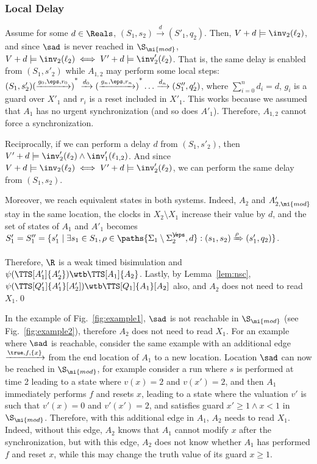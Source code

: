 \documentclass{LMCS}
\theoremstyle{plain}\newtheorem*{prop11}{Proposition~\ref{prop:states} bis}
\begin{document}
  \subsubsection*{Local Delay}
  Assume for some $d\in\Reals$, $(S_1,s_2)\xrightarrow{d}(S'_1,q_2)$.
  Then, \mbox{$V+d\models\inv_2(\ell_2)$}, and since $\sad$ is never reached
  in $\S_\mi{mod}$, $V+d\models\inv_2(\ell_2)\iff V'+d\models\inv'_2(\ell_2)$.
  That is, the same delay is enabled from $(S_1,s'_2)$ while $A_{1,2}$ may
  perform some local steps:
  $(S_1,s'_2){(\xrightarrow{g_0,\eps,r_0})}^*\xrightarrow{d_0}
  {(\xrightarrow{g_n,\eps,r_n})}^*\dots\xrightarrow{d_n}(S''_1,q'_2)$,
  where $\sum_{i=0}^nd_i=d$, $g_i$ is a guard over $X'_1$ and $r_i$ is a reset
  included in $X'_1$.
  This works because we assumed that $A_1$ has no urgent synchronization
  (and so does $A'_1$).
  Therefore, $A_{1,2}$ cannot force a synchronization.

  Reciprocally, if we can perform a delay $d$ from $(S_1,s'_2)$, then
  $V'+d\models\inv'_2(\ell_2)\land\inv'_1(\ell_{1,2})$.
And since
  $V+d\models\inv_2(\ell_2)\iff V'+d\models\inv'_2(\ell_2)$,
  we can perform the same delay from $(S_1,s_2)$.

  Moreover, we reach equivalent states in both systems. Indeed, $A_2$ and
  $A'_{2,\mi{mod}}$ stay in the same location, the clocks in $X_2\setminus X_1$
  increase their value by $d$, and the set of states of $A_1$ and $A'_1$ becomes
  $S'_1=S''_1=\{s'_1\mid \exists s_1\in S_1,\rho\in \paths{\Sigma_1\setminus\Sigma_{2}^{\not\eps},d}:
  (s_1,s_2)\xRightarrow{\rho}(s'_1,q_2)\}$.

  Therefore, $\R$ is a weak timed bisimulation and
  $\psi(\TTS[A'_1]{A'_2})\wtb\TTS[A_1]{A_2}$.
  Lastly, by Lemma~\ref{lem:nsc}, $\psi(\TTS[Q'_1]{A'_1}[A'_2])\wtb\TTS[Q_1]{A_1}[A_2]$
  also, and $A_2$ does not need to read $X_1$.\qed



In the example of Fig.~\ref{fig:example1}, $\sad$ is not reachable in
$\S_{\mi{mod}}$ (see Fig.~\ref{fig:example2}), therefore $A_2$ does not need
to read $X_1$.
For an example where $\sad$ is reachable, consider the same example with an
additional edge $\xrightarrow{\true,f,\{x\}}$ from the end location of $A_1$
to a new location. Location $\sad$ can now be reached in $\S_{\mi{mod}}$,
for example consider a run where $s$ is performed at time 2 leading to a state
where $v(x)=2$ and $v(x')=2$, and then $A_1$ immediately performs $f$
and resets $x$, leading to a state where the valuation $v'$ is such that
$v'(x)=0$ and $v'(x')=2$, and satisfies guard $x'\geq1\land x<1$ in
$\S_{\mi{mod}}$. Therefore, with this additional edge in $A_1$, $A_2$
needs to read $X_1$. Indeed, without this edge, $A_2$ knows that $A_1$
cannot modify $x$ after the synchronization, but with this edge, $A_2$ does
not know whether $A_1$ has performed $f$ and reset $x$, while this may
change the truth value of its guard $x\geq 1$.
\end{document}

